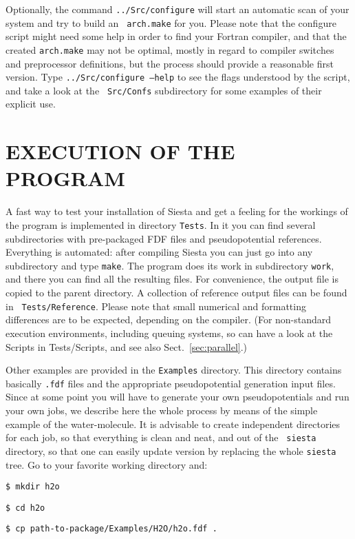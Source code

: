 \documentclass[11pt]{article}
\begin{document}
Optionally, the command {\tt ../Src/configure} will
start an automatic scan of your system and try to build an {\tt
  arch.make} for you. Please note that the configure script might need
some help in order to find your Fortran compiler, and that the created
{\tt arch.make} may not be optimal, mostly in regard to compiler
switches and preprocessor definitions, but the process should provide
a reasonable first version. Type {\tt ../Src/configure --help} to see
the flags understood by the script, and take a look at the {\tt
  Src/Confs} subdirectory for some examples of their explicit use.


\section{EXECUTION OF THE PROGRAM}

A fast way to test your installation of {\sc Siesta} and get a feeling
for the workings of the program is implemented in directory
{\tt Tests}. In it you can find several subdirectories
with pre-packaged FDF files and pseudopotential references. Everything
is automated: after compiling {\sc Siesta} you can just go into any
subdirectory and type {\tt make}. The program does its work in
subdirectory {\tt work}, and there you can find all the resulting
files. For convenience, the output file is copied to the parent
directory. A collection of reference output files can be found in {\tt
  Tests/Reference}. Please note that small numerical and
formatting differences are to be expected, depending on the compiler.
(For non-standard execution environments, including queuing systems,
so can have a look at the Scripts in Tests/Scripts, and see also Sect.~\ref{sec:parallel}.)

Other examples are provided in the {\tt Examples} directory. This
directory contains basically {\tt .fdf} files and the appropriate
pseudopotential generation input files. Since at some point you will
have to generate your own pseudopotentials and run your own jobs, we
describe here the whole process by means of the simple example of the
water-molecule. It is advisable to create independent directories for
each job, so that everything is clean and neat, and out of the {\tt
siesta} directory, so that one can easily update version by replacing
the whole {\tt siesta} tree. Go to your favorite working directory
and:

{\tt \$ mkdir h2o}

{\tt \$ cd h2o}

{\tt \$ cp path-to-package/Examples/H2O/h2o.fdf .}
\end{document}
